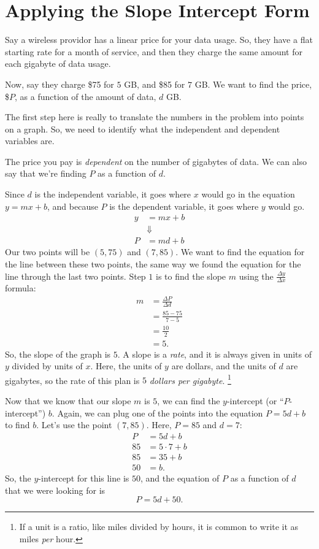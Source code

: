 \documentclass[12pt]{article}
\begin{document}
\section{Applying the Slope Intercept Form}
Say a wireless providor has a linear price for your data usage. So, they have a flat starting rate for a month of service, and then they charge the same amount for each gigabyte of data usage.
\par Now, say they charge \$75 for $5$ GB, and \$85 for $7$ GB. We want to find the price, \$$P$, as a function of the amount of data, $d$ GB.
\par The first step here is really to translate the numbers in the problem into points on a graph. So, we need to identify what the independent and dependent variables are.
\par The price you pay is \textit{dependent} on the number of gigabytes of data. We can also say that we're finding $P$ as a function of $d$. 
\par Since $d$ is the independent variable, it goes where $x$ would go in the equation $y = mx + b$, and because $P$ is the dependent variable, it goes where $y$ would go.
\begin{align*}
y &= mx + b\\
&\Downarrow\\
P &= md + b
\end{align*}
Our two points will be $(5, 75)$ and $(7, 85)$. We want to find the equation for the line between these two points, the same way we found the equation for the line through the last two points. Step $1$ is to find the slope $m$ using the $\frac{\Delta y}{\Delta x}$ formula:
\begin{align*}
 m &= \frac{\Delta P}{\Delta d}\\
&= \frac{85 - 75}{7 - 5}\\
&= \frac{10}{2}\\
&= 5.
\end{align*}
So, the slope of the graph is $5$. A slope is a \textit{rate}, and it is always given in units of $y$ divided by units of $x$. Here, the units of $y$ are dollars, and the units of $d$ are gigabytes, so the rate of this plan is $5$  \textit{dollars per gigabyte}. \footnote{If a unit is a ratio, like miles divided by hours, it is common to write it as miles \textit{per} hour.} 
\par Now that we know that our slope $m$ is $5$, we can find the $y$-intercept (or ``$P$-intercept'') $b$. Again, we can plug one of the points into the equation $P = 5d + b$ to find $b$. Let's use the point $(7, 85)$. Here, $P = 85$ and $d = 7$:
\begin{align*}
 P &= 5d + b\\
85 &= 5 \cdot 7 + b\\
85 &= 35 + b\\
50 &= b.
\end{align*}
So, the $y$-intercept for this line is $50$, and the equation of $P$ as a function of $d$ that we were looking for is 
\[P = 5d + 50.\]
\end{document}

